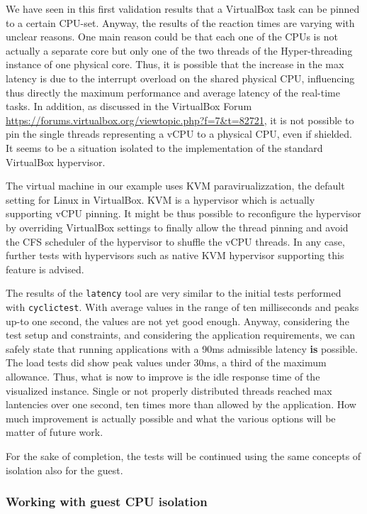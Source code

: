 \documentclass[]{scrartcl}
\begin{document}
We have seen in this first validation results that a VirtualBox task can be pinned to a certain CPU-set. Anyway, the results of the reaction times are varying with unclear reasons. 
One main reason could be that each one of the CPUs is not actually a separate core but only one of the two threads of the Hyper-threading instance of one physical core. 
Thus, it is possible that the increase in the max latency is due to the interrupt overload on the shared physical CPU, influencing thus directly the maximum performance and average latency of the real-time tasks.
In addition, as discussed in the VirtualBox Forum \url{https://forums.virtualbox.org/viewtopic.php?f=7&t=82721}, it is not possible to pin the single threads representing a vCPU to a physical CPU, even if shielded. It seems to be a situation isolated to the implementation of the standard VirtualBox hypervisor. 

The virtual machine in our example uses KVM paravirualizzation, the default setting for Linux in VirtualBox. 
KVM is a hypervisor which is actually supporting vCPU pinning. It might be thus possible to reconfigure the hypervisor by overriding VirtualBox settings to finally allow the thread pinning and avoid the CFS scheduler of the hypervisor to shuffle the vCPU threads.
In any case, further tests with hypervisors such as native KVM hypervisor supporting this feature is advised.

The results of the \texttt{latency} tool are very similar to the initial tests performed with \texttt{cyclictest}. With average values in the range of ten milliseconds and peaks up-to one second, the values are not yet good enough. 
Anyway, considering the test setup and constraints, and considering the application requirements, we can safely state that running applications with a 90ms admissible latency \textbf{is} possible. The load tests did show peak values under 30ms, a third of the maximum allowance. 
Thus, what is now to improve is the idle response time of the visualized instance. Single or not properly distributed threads reached max lantencies over one second, ten times more than allowed by the application. How much improvement is actually possible and what the various options will be matter of future work.

For the sake of completion, the tests will be continued using the same concepts of isolation also for the guest.

\subsubsection{Working with guest CPU isolation}
\end{document}
